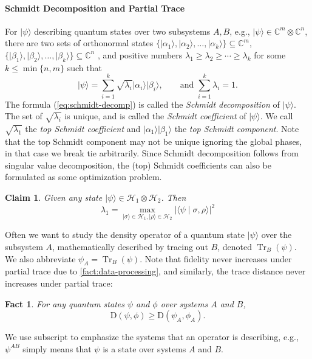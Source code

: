 \documentclass[10pt,a4paper]{article}
\newtheorem{claim}[theorem]{Claim}
\newtheorem{fact}[theorem]{Fact}
\theoremstyle{remark}
\newcommand{\C}{{\mathbb C}}
\newcommand{\cH}{\mathcal{H}}
\newcommand{\1}[1]{\mathds{1}{[#1]}}
\newcommand{\ket}[1]{\lvert #1\rangle}
\newcommand{\trace}{\operatorname{Tr}}
\newcommand{\TD}{\mathrm{D}}
\numberwithin{equation}{section}
\begin{document}
\paragraph{Schmidt Decomposition and Partial Trace} 
For $\ket\psi$ describing quantum states over two subsystems $A,B$, e.g., $\ket\psi\in\C^m \otimes \C^n$, there are two sets of orthonormal states $\{\ket{\alpha_1}, \ket{\alpha_2}, \ldots, \ket{\alpha_k}\}\subseteq \C^m$, $\{\ket{\beta_1}, \ket{\beta_2}, \ldots, \ket{\beta_k}\}\subseteq \C^n$ , and positive numbers $\lambda_1\ge \lambda_2\ge \cdots \ge \lambda_k$ for some $k\le \min\{n,m\}$ such that
\begin{equation}
    \ket\psi = \sum_{i=1}^k \sqrt{\lambda_i} \ket{\alpha_i}\ket{\beta_i}, \qquad \text{and } \sum_{i=1}^k \lambda_i = 1.\label{eq:schmidt-decomp}
\end{equation}
The formula (\ref{eq:schmidt-decomp}) is called the \emph{Schmidt decomposition} of $\ket\psi$. The set of $\sqrt{\lambda_i}$ is unique, and is called the \emph{Schmidt coefficient} of $\ket\psi$. 
We  call $\sqrt{\lambda_1}$ the \emph{top Schmidt coefficient} and $\ket{\alpha_1}\ket{\beta_1}$ the \emph{top Schmidt component}. 
Note that the top Schmidt component may not be unique ignoring the global phases, in that case we break  tie arbitrarily. Since Schmidt decomposition follows from singular value decomposition, the (top) Schmidt coefficients can also be formulated as some optimization problem.
\begin{claim}\label{claim:top-schmidt-coeff}
Given any state $\ket\psi\in \cH_1\otimes\cH_2$. Then
\begin{equation*}
    \lambda_1 = \max_{\ket\sigma\in \cH_1, \ket\rho\in\cH_2}|\langle \psi \mid \sigma,\rho \rangle |^2
\end{equation*}
\end{claim}

Often we want to study the density operator of a quantum state $\ket\psi$ over the subsystem $A$, mathematically described by tracing out $B$, denoted  $\trace_B(\psi)$.
We also abbreviate $\psi_A=\trace_B(\psi)$. Note that fidelity never increases under partial trace due to \cref{fact:data-processing}, and similarly, the trace distance never increases under partial trace:
\begin{fact} \label{fact:trace-dist-partial-trace}
For any quantum states $\psi$ and $\phi$ over systems $A$ and $B$,
\[
    \TD(\psi, \phi) \ge \TD(\psi_A, \phi_A).
\]
\end{fact}
We use subscript to emphasize the systems that an operator is describing, e.g., $\psi^{AB}$ simply means that $\psi$ is a state over systems $A$ and $B$.
\end{document}
